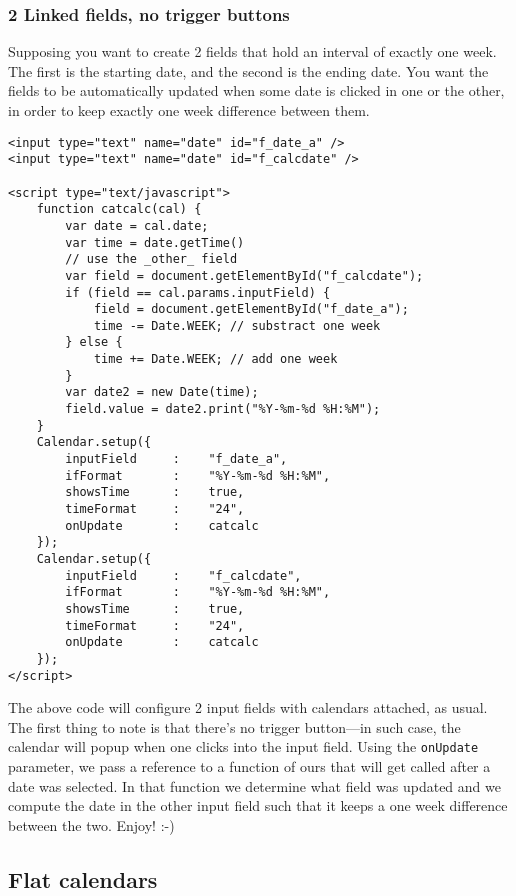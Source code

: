 \documentclass[a4paper,twoside,10pt]{dynadoc}
\begin{document}
\subsubsection{2 Linked fields, no trigger buttons}

Supposing you want to create 2 fields that hold an interval of exactly one
week.  The first is the starting date, and the second is the ending date.
You want the fields to be automatically updated when some date is clicked in
one or the other, in order to keep exactly one week difference between them.

\begin{verbatim}
<input type="text" name="date" id="f_date_a" />
<input type="text" name="date" id="f_calcdate" />

<script type="text/javascript">
    function catcalc(cal) {
        var date = cal.date;
        var time = date.getTime()
        // use the _other_ field
        var field = document.getElementById("f_calcdate");
        if (field == cal.params.inputField) {
            field = document.getElementById("f_date_a");
            time -= Date.WEEK; // substract one week
        } else {
            time += Date.WEEK; // add one week
        }
        var date2 = new Date(time);
        field.value = date2.print("%Y-%m-%d %H:%M");
    }
    Calendar.setup({
        inputField     :    "f_date_a",
        ifFormat       :    "%Y-%m-%d %H:%M",
        showsTime      :    true,
        timeFormat     :    "24",
        onUpdate       :    catcalc
    });
    Calendar.setup({
        inputField     :    "f_calcdate",
        ifFormat       :    "%Y-%m-%d %H:%M",
        showsTime      :    true,
        timeFormat     :    "24",
        onUpdate       :    catcalc
    });
</script>
\end{verbatim}

The above code will configure 2 input fields with calendars attached, as
usual.  The first thing to note is that there's no trigger button---in such
case, the calendar will popup when one clicks into the input field.  Using
the \texttt{onUpdate} parameter, we pass a reference to a function of ours
that will get called after a date was selected.  In that function we
determine what field was updated and we compute the date in the other input
field such that it keeps a one week difference between the two.  Enjoy! :-)

\subsection{Flat calendars}
\end{document}
